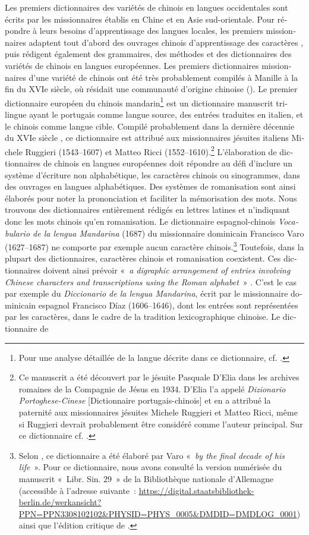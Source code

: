 \documentclass[output=paper,colorlinks,citecolor=brown,arabicfont,chinesefont,booklanguage=french]{langscibook}
\begin{document}
\begin{otherlanguage}{french}
Les premiers dictionnaires des variétés de chinois en langues occidentales sont écrits par les missionnaires établis en Chine et en Asie sud-orientale. Pour répondre à leurs besoins d’apprentissage des langues locales, les premiers missionnaires adaptent tout d’abord des ouvrages chinois d’apprentissage des caractères \citep[247--249]{Brockey2007}, puis rédigent également des grammaires, des méthodes et des dictionnaires des variétés de chinois en langues européennes. Les premiers dictionnaires missionnaires d’une variété de chinois ont été très probablement compilés à Manille à la fin du XVIe siècle, où résidait une communauté d’origine chinoise (\cites[615]{Zwartjes2019}{Kloter2011}). Le premier dictionnaire européen du chinois mandarin\footnote{Pour une analyse détaillée de la langue décrite dans ce dictionnaire, cf. \citet{Yang2001}.} est un dictionnaire manuscrit trilingue ayant le portugais comme langue source, des entrées traduites en italien, et le chinois comme langue cible. Compilé probablement dans la dernière décennie du XVIe siècle \citep[51]{Raini2010}, ce dictionnaire est attribué aux missionnaires jésuites italiens Michele Ruggieri (1543--1607) et Matteo Ricci (1552--1610).\footnote{Ce manuscrit a été découvert par le jésuite Pasquale D’Elia dans les archives romaines de la Compagnie de Jésus en 1934. D’Elia l’a appelé \emph{Dizionario Portoghese-Cinese} [Dictionnaire portugais-chinois] et en a attribué la paternité aux missionnaires jésuites Michele Ruggieri et Matteo Ricci, même si Ruggieri devrait probablement être considéré comme l'auteur principal. Sur ce dictionnaire cf. \citet{Yang2001}.} L’élaboration de dictionnaires de chinois en langues européennes doit répondre au défi d’inclure un système d’écriture non alphabétique, les caractères chinois ou sinogrammes, dans des ouvrages en langues alphabétiques. Des systèmes de romanisation sont ainsi élaborés pour noter la prononciation et faciliter la mémorisation des mots. Nous trouvons des dictionnaires entièrement rédigés en lettres latines et n’indiquant donc les mots chinois qu’en romanisation. Le dictionnaire espagnol-chinois \emph{Vocabulario de la lengua Mandarina} (1687) du missionnaire dominicain Francisco Varo (1627--1687) ne comporte par exemple aucun caractère chinois.\footnote{Selon \citet[12]{Coblin2006}, ce dictionnaire a été élaboré par Varo «~\emph{by the final decade of his life}~». Pour ce dictionnaire, nous avons consulté la version numérisée du manuscrit «~Libr. Sin. 29~» de la Bibliothèque nationale d'Allemagne (accessible à l’adresse suivante~: \url{https://digital.staatsbibliothek-berlin.de/werkansicht?PPN=PPN3308102102\&PHYSID=PHYS\_0005\&DMDID=DMDLOG\_0001}) ainsi que l’édition critique de \citet{Coblin2006}.} Toutefois, dans la plupart des dictionnaires, caractères chinois et romanisation coexistent. Ces dictionnaires doivent ainsi prévoir «~\emph{a digraphic arrangement of entries involving Chinese characters and transcriptions using the Roman alphabet}~» \citep[325]{Kloter2019}. C’est le cas par exemple du \emph{Diccionario de la lengua Mandarina}, écrit par le missionnaire dominicain espagnol Francisco Díaz (1606--1646), dont les entrées sont représentées par les caractères, dans le cadre de la tradition lexicographique chinoise. Le dictionnaire de 
\end{otherlanguage}
\end{document}
